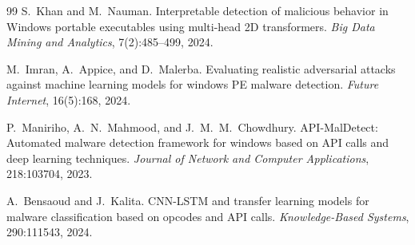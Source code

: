 \begin{thebibliography}{99}
S.~Khan and M.~Nauman.
\newblock Interpretable detection of malicious behavior in Windows portable executables using multi-head 2D transformers.
\newblock \emph{Big Data Mining and Analytics}, 7(2):485--499, 2024.

M.~Imran, A.~Appice, and D.~Malerba.
\newblock Evaluating realistic adversarial attacks against machine learning models for windows PE malware detection.
\newblock \emph{Future Internet}, 16(5):168, 2024.

P.~Maniriho, A.~N.~Mahmood, and J.~M.~M.~Chowdhury.
\newblock API-MalDetect: Automated malware detection framework for windows based on API calls and deep learning techniques.
\newblock \emph{Journal of Network and Computer Applications}, 218:103704, 2023.

A.~Bensaoud and J.~Kalita.
\newblock CNN-LSTM and transfer learning models for malware classification based on opcodes and API calls.
\newblock \emph{Knowledge-Based Systems}, 290:111543, 2024.

\end{thebibliography}
